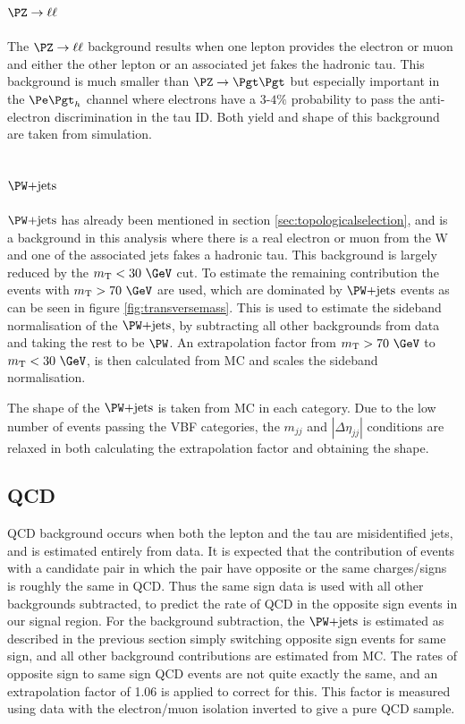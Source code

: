\subsection{$\PZ\to\ell\ell$}
\label{sec:backgroundEstimation_Zll}

The $\PZ\to\ell\ell$ background results when one lepton provides the electron or
muon and either the other lepton or an associated jet fakes the hadronic tau. This
background is much smaller than $\ZToTauTau$ but especially important in the
$\etau$ channel where electrons have a $3$-$4\%$ probability to pass the
anti-electron discrimination in the tau ID. Both yield and shape of this
background are taken from simulation.

\subsection{$\WJets$}
\label{sec:backgroundEstimation_WplusJets}

$\WJets$ has already been mentioned in section \ref{sec:topologicalselection},
and is a background in this analysis where there is a real electron or
muon from the W and one of the associated jets fakes a hadronic tau. This
background is largely reduced by the $m_{\text{T}}< 30~\GeV$ cut. 
To estimate the remaining contribution the
events with $m_{\text{T}}> 70~\GeV$ are used, which are dominated by $\WJets$ 
events as can be seen in figure \ref{fig:transversemass}. 
This is used to estimate the sideband normalisation of the $\WJets$, by
subtracting all other backgrounds from data and taking the rest to be $\PW$.
An extrapolation factor from  $m_{\text{T}} > 70~\GeV$ to $m_{\text{T}}< 30~\GeV$, 
is then calculated from MC and scales the sideband normalisation.

The shape of the $\WJets$ is taken from MC in each category. Due to the low number of
events passing the VBF categories, the $m_{jj}$ and $|\Delta\eta_{jj}|$
conditions are relaxed in both calculating the extrapolation factor and
obtaining the shape.

\subsection{QCD}
\label{sec:backgroundEstimation_QCD}

QCD background occurs when both the lepton and the tau are misidentified jets, and is estimated 
entirely from data. It is expected that the contribution of events with a
candidate pair in which the pair have opposite or the same
charges/signs is roughly the same in QCD. Thus the same
sign data is used with all other backgrounds subtracted, to predict the rate of
QCD in the opposite sign events in our signal region. 
For the background subtraction, the $\WJets$ is 
estimated as described in the previous section simply switching opposite sign
events for same sign, and all other background
contributions are estimated from \ac{MC}. The rates of opposite sign to same
sign QCD events are not quite exactly the same, and an extrapolation factor of
1.06 is applied to correct for this. This factor is measured using data with the 
electron/muon isolation inverted to give a pure QCD sample. 

